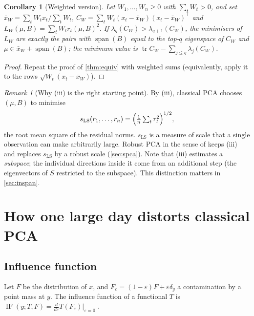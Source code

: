 \documentclass[11pt]{article}
\newtheorem{corollary}[theorem]{Corollary}
\theoremstyle{definition}
\theoremstyle{remark}
\newtheorem{remark}[theorem]{Remark}
\DeclareMathOperator{\tr}{tr}
\DeclareMathOperator{\spn}{span}
\DeclareMathOperator{\IF}{IF}
\begin{document}
\begin{corollary}[Weighted version]\label{cor:weighted}
Let $W_1,\dots,W_n\ge0$ with $\sum_tW_t>0$, and set $\bar x_W=\sum_tW_tx_t/\sum_tW_t$,
$C_W=\sum_tW_t(x_t-\bar x_W)(x_t-\bar x_W)^\top$ and $L_W(\mu,B)=\sum_tW_tr_t(\mu,B)^2$.
If $\lambda_q(C_W)>\lambda_{q+1}(C_W)$, the minimisers of $L_W$ are exactly the pairs with
$\spn(B)$ equal to the top-$q$ eigenspace of $C_W$ and $\mu\in\bar x_W+\spn(B)$; the minimum value is
$\tr C_W-\sum_{j\le q}\lambda_j(C_W)$.
\end{corollary}
\begin{proof}
Repeat the proof of \cref{thm:equiv} with weighted sums (equivalently, apply it to the rows
$\sqrt{W_t}(x_t-\bar x_W)$).
\end{proof}

\begin{remark}[Why (iii) is the right starting point]\label{rem:scale}
By (iii), classical PCA chooses $(\mu,B)$ to minimise
\[
s_{\mathrm{LS}}(r_1,\dots,r_n)=\Bigl(\tfrac1n\textstyle\sum_tr_t^2\Bigr)^{1/2},
\]
the root mean square of the residual norms. $s_{\mathrm{LS}}$ is a measure of scale that a single
observation can make arbitrarily large. Robust PCA in the sense of \citet{Maronna2005} keeps
(iii) and replaces $s_{\mathrm{LS}}$ by a robust scale (\cref{sec:spca}). Note that (iii) estimates a
\emph{subspace}; the individual directions inside it come from an additional step (the eigenvectors of
$S$ restricted to the subspace). This distinction matters in \cref{sec:inspan}.
\end{remark}

\section{How one large day distorts classical PCA}\label{sec:sensitivity}

\subsection{Influence function}

Let $F$ be the distribution of $x$, and $F_\varepsilon=(1-\varepsilon)F+\varepsilon\delta_y$ a contamination
by a point mass at $y$. The influence function of a functional $T$ is
$\IF(y;T,F)=\frac{d}{d\varepsilon}T(F_\varepsilon)\big|_{\varepsilon=0}$ \citep{HampelEtAl1986}.
\end{document}
